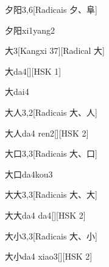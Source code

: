 \begin{entry}{夕阳}{3,6}[Radicais ⼣、⾩]
  \begin{phonetics}{夕阳}{xi1yang2}
  \end{phonetics}
\end{entry}

\begin{entry}{大}{3}[Kangxi 37][Radical ⼤]
  \begin{phonetics}{大}{da4}[][HSK 1]
  \end{phonetics}
  \begin{phonetics}{大}{dai4}
  \end{phonetics}
\end{entry}

\begin{entry}{大人}{3,2}[Radicais ⼤、⼈]
  \begin{phonetics}{大人}{da4 ren2}[][HSK 2]
  \end{phonetics}
\end{entry}

\begin{entry}{大口}{3,3}[Radicais ⼤、⼝]
  \begin{phonetics}{大口}{da4kou3}
  \end{phonetics}
\end{entry}

\begin{entry}{大大}{3,3}[Radicais ⼤、⼤]
  \begin{phonetics}{大大}{da4 da4}[][HSK 2]
  \end{phonetics}
\end{entry}

\begin{entry}{大小}{3,3}[Radicais ⼤、⼩]
  \begin{phonetics}{大小}{da4 xiao3}[][HSK 2]
  \end{phonetics}
\end{entry}

